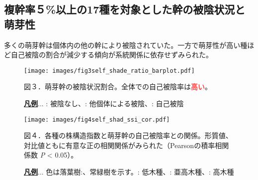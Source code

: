 \documentclass[a0, 30pt, plainboxedsections]{sciposter} %
\renewcommand{\baselinestretch}{1.2}
\begin{document}
\begin{multicols}{2}
\begin{mdframed}[style=subsection.frame,frametitle={\textbf{\color{Black1}{\LARGE{\ding{192}}\Large{25種の株構造は種間で大きく異なる}}}}]
\end{mdframed}

\renewcommand{\baselinestretch}{0.8}
\begin{mdframed}[style=subsection.frame,frametitle=\textbf{\color{Black1}{\LARGE{\ding{194}}\Large{萌芽性が強い種ほど自己被陰率が下がる}}}]
\renewcommand{\baselinestretch}{1.2}

\subsection*{複幹率５\%以上の17種を対象とした幹の被陰状況と萌芽性}

多くの萌芽幹は個体内の他の幹により被陰されていた。一方で萌芽性が高い種ほど自己被陰の割合が減少する傾向が系統関係に依存せずみられた。

\renewcommand{\baselinestretch}{0.8}
\begin{figure}
 \begin{minipage}{0.5\hsize}
  \centering
   \texttt{[image: images/fig3self\_shade\_ratio\_barplot.pdf]} %

   {\tiny 図３．萌芽幹の被陰状況割合。全体での自己被陰率は\textcolor{red}{高い}。\newline
   
   \textbf{\underline{凡例}}... \textcolor{black}{}: 被陰なし、\textcolor{lightgray}{}: 他個体による被陰、\textcolor{white}{}: 自己被陰}
 \end{minipage}
 \begin{minipage}{0.5\hsize}
  \centering
   \texttt{[image: images/fig4self\_shad\_ssi\_cor.pdf]}
   {\tiny 図４．各種の株構造指数と萌芽幹の自己被陰率との関係。形質値、対比値ともに有意な正の相関関係がみられた（Pearsonの積率相関係数 \textit{P} < 0.05）。
   
   \textbf{\underline{凡例}}... 色は\textcolor{Orange1}{落葉樹}:、\textcolor{Blue1}{常緑樹}を示す。: 低木種、: 亜高木種、: 高木種}
 \end{minipage}
\end{figure}
\renewcommand{\baselinestretch}{1.2}


\end{mdframed}

\columnbreak
\renewcommand{\baselinestretch}{0.8}
\begin{mdframed}[style=subsection.frame,frametitle=\textbf{\color{Black1}{\LARGE{\ding{193}}\Large{樹高が高くなるほど萌芽性が強くなる}}}]
\renewcommand{\baselinestretch}{1.2} %


\end{mdframed}
\end{multicols}
\end{document}
